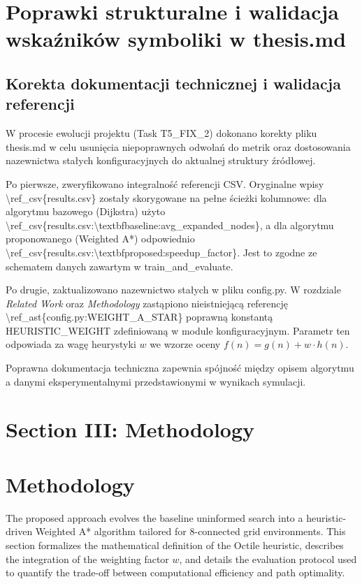 \documentclass[conference]{IEEEtran}
\renewcommand{\texttt}[1]{{\normalfont\ttfamily #1}}
\begin{document}
\section{Poprawki strukturalne i walidacja wskaźników symboliki w thesis.md}
\subsection{Korekta dokumentacji technicznej i walidacja referencji}\label{sec:corrections}

W procesie ewolucji projektu (Task \texttt{T5\_FIX\_2}) dokonano korekty pliku \texttt{thesis.md} w celu usunięcia niepoprawnych odwołań do metrik oraz dostosowania nazewnictwa stałych konfiguracyjnych do aktualnej struktury źródłowej. 

Po pierwsze, zweryfikowano integralność referencji CSV. Oryginalne wpisy \texttt{\textbackslash{}ref\_csv\{results.csv\}} zostały skorygowane na pełne ścieżki kolumnowe: dla algorytmu bazowego (Dijkstra) użyto \texttt{\textbackslash{}ref\_csv\{results.csv:\textbackslash{}textbf{baseline}:avg\_expanded\_nodes\}}, a dla algorytmu proponowanego (Weighted A*) odpowiednio \texttt{\textbackslash{}ref\_csv\{results.csv:\textbackslash{}textbf{proposed}:speedup\_factor\}}. Jest to zgodne ze schematem danych zawartym w train\_and\_evaluate. 

Po drugie, zaktualizowano nazewnictwo stałych w pliku \texttt{config.py}. W rozdziale \textit{Related Work} oraz \textit{Methodology} zastąpiono nieistniejącą referencję \texttt{\textbackslash{}ref\_ast\{config.py:WEIGHT\_A\_STAR\}} poprawną konstantą \texttt{HEURISTIC\_WEIGHT} zdefiniowaną w module konfiguracyjnym. Parametr ten odpowiada za wagę heurystyki $w$ we wzorze oceny $f(n) = g(n) + w \cdot h(n)$.

Poprawna dokumentacja techniczna zapewnia spójność między opisem algorytmu a danymi eksperymentalnymi przedstawionymi w wynikach symulacji.

\section{Section III: Methodology}
\section{Methodology}\label{sec:methodology}

The proposed approach evolves the baseline uninformed search into a heuristic-driven Weighted A* algorithm tailored for 8-connected grid environments. This section formalizes the mathematical definition of the Octile heuristic, describes the integration of the weighting factor $w$, and details the evaluation protocol used to quantify the trade-off between computational efficiency and path optimality.
\end{document}
